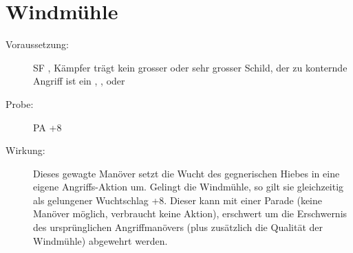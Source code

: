 \section{Windmühle}
\label{reaktion.windmuehle}
\begin{description}
    \item[Voraussetzung:]
        SF , Kämpfer trägt kein grosser oder sehr grosser Schild, der zu konternde Angriff ist ein , ,  oder 
    \item[Probe:]
        PA +8
    \item[Wirkung:]
        Dieses gewagte Manöver setzt die Wucht des gegnerischen Hiebes in eine eigene Angriffs-Aktion um.
        Gelingt die Windmühle, so gilt sie gleichzeitig als gelungener Wuchtschlag +8.
        Dieser kann mit einer Parade (keine Manöver möglich, verbraucht keine Aktion), erschwert um die Erschwernis des ursprünglichen Angriffmanövers (plus zusätzlich die Qualität der Windmühle) abgewehrt werden.
\end{description}
